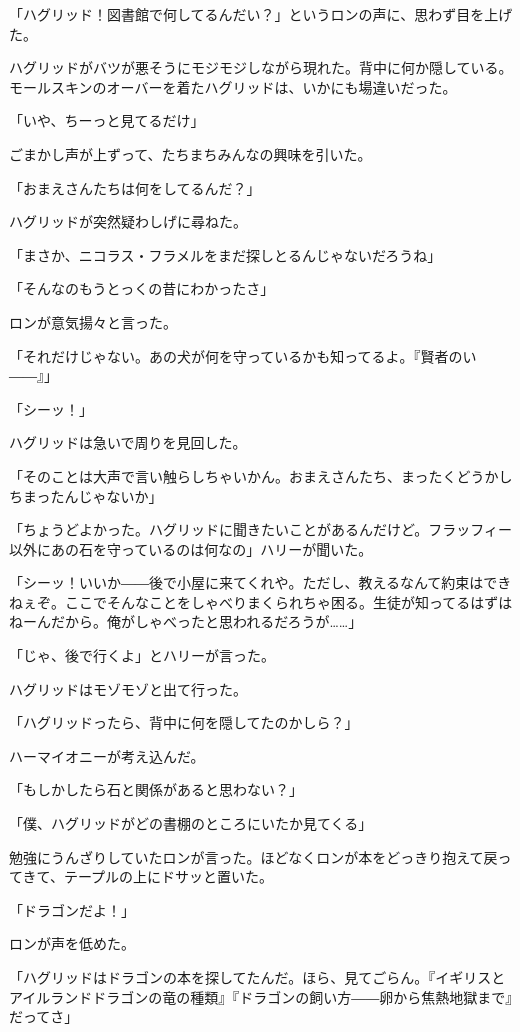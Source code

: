 \documentclass[10pt,a4paper]{article}
\begin{document}
\begin{CJK}{UTF8}{min}
「ハグリッド！図書館で何してるんだい？」というロンの声に、思わず目を上げた。

ハグリッドがバツが悪そうにモジモジしながら現れた。背中に何か隠している。モールスキンのオーバーを着たハグリッドは、いかにも場違いだった。

「いや、ちーっと見てるだけ」

ごまかし声が上ずって、たちまちみんなの興味を引いた。

「おまえさんたちは何をしてるんだ？」

ハグリッドが突然疑わしげに尋ねた。

「まさか、ニコラス・フラメルをまだ探しとるんじゃないだろうね」

「そんなのもうとっくの昔にわかったさ」

ロンが意気揚々と言った。

「それだけじゃない。あの犬が何を守っているかも知ってるよ。『賢者のい――』」

「シーッ！」

ハグリッドは急いで周りを見回した。

「そのことは大声で言い触らしちゃいかん。おまえさんたち、まったくどうかしちまったんじゃないか」

「ちょうどよかった。ハグリッドに聞きたいことがあるんだけど。フラッフィー以外にあの石を守っているのは何なの」ハリーが聞いた。

「シーッ！いいか――後で小屋に来てくれや。ただし、教えるなんて約束はできねぇぞ。ここでそんなことをしゃべりまくられちゃ困る。生徒が知ってるはずはねーんだから。俺がしゃべったと思われるだろうが……」

「じゃ、後で行くよ」とハリーが言った。

ハグリッドはモゾモゾと出て行った。

「ハグリッドったら、背中に何を隠してたのかしら？」

ハーマイオニーが考え込んだ。

「もしかしたら石と関係があると思わない？」

「僕、ハグリッドがどの書棚のところにいたか見てくる」

勉強にうんざりしていたロンが言った。ほどなくロンが本をどっきり抱えて戻ってきて、テープルの上にドサッと置いた。

「ドラゴンだよ！」

ロンが声を低めた。

「ハグリッドはドラゴンの本を探してたんだ。ほら、見てごらん。『イギリスとアイルランドドラゴンの竜の種類』『ドラゴンの飼い方――卵から焦熱地獄まで』だってさ」


\end{CJK}
\end{document}
